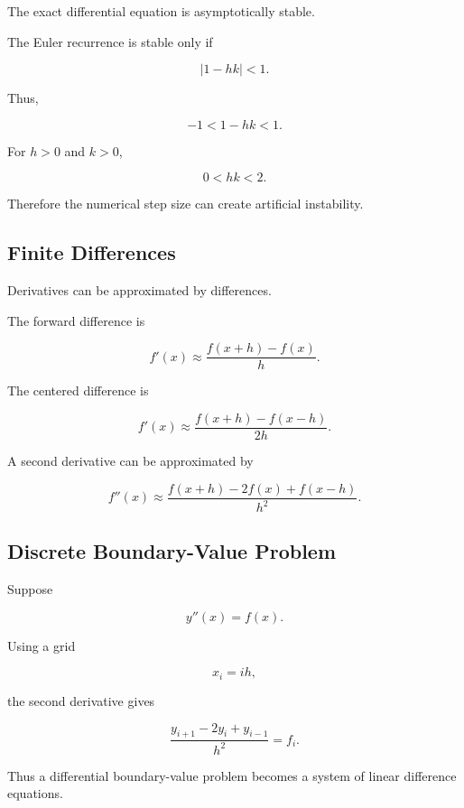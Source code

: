 The exact differential equation is asymptotically stable.

The Euler recurrence is stable only if

\[
\boxed{
|1-hk|<1.
}
\]

Thus,

\[
-1<1-hk<1.
\]

For \(h>0\) and \(k>0\),

\[
\boxed{
0<hk<2.
}
\]

Therefore the numerical step size can create artificial instability.

\subsection{Finite Differences}
\label{subsec:finite-differences-difference-equations}

Derivatives can be approximated by differences.

The forward difference is

\[
\boxed{
f'(x)
\approx
\frac{
f(x+h)-f(x)
}{
h
}.
}
\]

The centered difference is

\[
\boxed{
f'(x)
\approx
\frac{
f(x+h)-f(x-h)
}{
2h
}.
}
\]

A second derivative can be approximated by

\[
\boxed{
f''(x)
\approx
\frac{
f(x+h)-2f(x)+f(x-h)
}{
h^2
}.
}
\]

\subsection{Discrete Boundary-Value Problem}
\label{subsec:discrete-boundary-value-problem}

Suppose

\[
y''(x)=f(x).
\]

Using a grid

\[
x_i=ih,
\]

the second derivative gives

\[
\boxed{
\frac{
y_{i+1}-2y_i+y_{i-1}
}{
h^2
}
=
f_i.
}
\]

Thus a differential boundary-value problem becomes a system of linear
difference equations.

